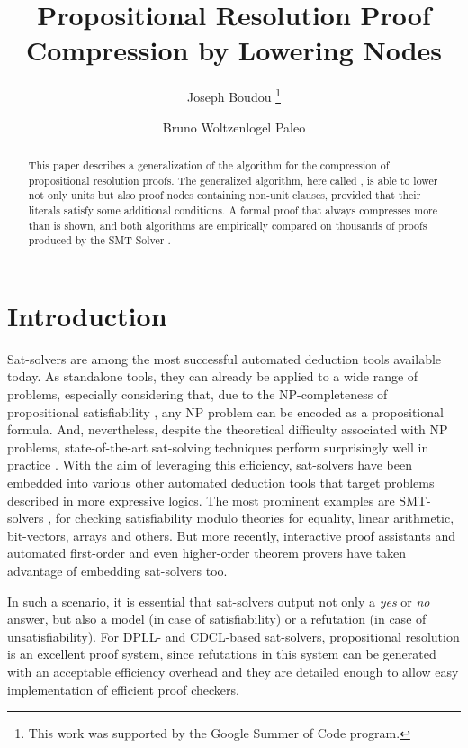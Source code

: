 \documentclass{llncs}
\title{Propositional Resolution Proof Compression by Lowering Nodes}
\author{
  Joseph Boudou\inst{1}
  \thanks{This work was supported by the Google Summer of Code program.}
  \and 
  Bruno Woltzenlogel Paleo\inst{2}
}
\institute{
  Universit\'e Paul Sabatier, Toulouse \\
  \email{joseph.boudou@matabio.net}
  \and 
  Vienna University of Technology \\
  \email{bruno@logic.at}
}
\begin{document}
\maketitle


\begin{abstract}
This paper describes a generalization of the {\LowerUnits} algorithm \cite{LURPI}
for the compression of propositional resolution proofs. 
The generalized algorithm, here called {\LowerUnivalents}, is
able to lower not only units but also proof nodes containing non-unit clauses, 
provided that their literals satisfy some additional conditions. 
A formal proof that {\LowerUnivalents} always compresses more than {\LowerUnits} is shown, 
and both algorithms are empirically compared on
thousands of proofs produced by the SMT-Solver \veriT.
\end{abstract}



\section{Introduction}

Sat-solvers are among the most successful automated deduction tools available today. As standalone
tools, they can already be applied to a wide range of problems, especially considering that, due to
the NP-completeness of propositional satisfiability \cite{cook}, any NP problem can be encoded as a
propositional formula. And, nevertheless, despite the theoretical difficulty associated with NP
problems, state-of-the-art sat-solving techniques perform surprisingly well in practice
\cite{sat-competition}. With the aim of leveraging this efficiency, sat-solvers have been embedded
into various other automated deduction tools that target problems described in more expressive
logics. The most prominent examples are SMT-solvers \cite{veriT}, for checking satisfiability modulo
theories for equality, linear arithmetic, bit-vectors, arrays and others. But more recently,
interactive proof assistants \cite{isabelle-blanchette-boehme} and automated first-order
\cite{spassT?MELIA?iProver?Vampire?} and even higher-order \cite{satallax} theorem provers have
taken advantage of embedding sat-solvers too.

In such a scenario, it is essential that sat-solvers output not only a \emph{yes} or \emph{no}
answer, but also a model (in case of satisfiability) or a refutation (in case of unsatisfiability).
For DPLL- and CDCL-based sat-solvers, propositional resolution is an excellent proof system, since
refutations in this system can be generated with an acceptable efficiency overhead and they are
detailed enough to allow easy implementation of efficient proof checkers.
\end{document}
